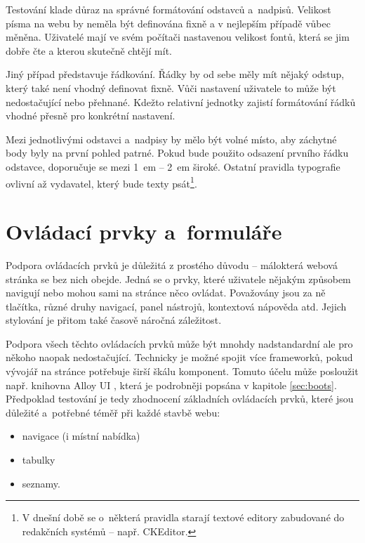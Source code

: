 \documentclass[thesis=B,czech]{FITthesis}[2012/06/26]
\begin{document}
Testování klade důraz na správné formátování odstavců a~nadpisů. Velikost písma na webu by neměla být definována fixně a v nejlepším případě vůbec měněna. Uživatelé mají ve svém počítači  nastavenou velikost fontů, která se jim dobře čte a kterou skutečně chtějí mít. 

Jiný případ představuje řádkování. Řádky by od sebe měly mít nějaký odstup, který také není vhodný definovat fixně. Vůči nastavení uživatele to může být nedostačující nebo přehnané. Kdežto relativní jednotky zajistí formátování řádků vhodné přesně pro konkrétní nastavení. 

Mezi jednotlivými odstavci a~nadpisy by mělo být volné místo, aby záchytné body byly na první pohled patrné. Pokud bude použito odsazení prvního řádku odstavce, doporučuje se mezi 1~em -- 2~em široké\cite{typo2}. Ostatní pravidla typografie ovlivní až vydavatel, který bude texty psát\footnote{V dnešní době se o~některá pravidla starají textové editory zabudované do redakčních systémů -- např. CKEditor.}. 



\section{Ovládací prvky a~formuláře}



Podpora ovládacích prvků je důležitá z prostého důvodu -- málokterá webová stránka se bez nich obejde. Jedná se o prvky, které uživatele nějakým způsobem navigují nebo mohou sami na stránce něco ovládat. Považovány jsou za ně tlačítka, různé druhy navigací, panel nástrojů, kontextová nápověda atd. Jejich stylování je přitom také časově náročná záležitost.  

Podpora všech těchto ovládacích prvků může být mnohdy nadstandardní ale pro někoho naopak nedostačující. Technicky je možné spojit více frameworků, pokud vývojář na stránce potřebuje širší škálu komponent. Tomuto účelu může posloužit např. knihovna Alloy UI , která je podrobněji popsána v kapitole \ref{sec:boots}. Předpoklad testování je tedy zhodnocení základních ovládacích prvků, které jsou důležité a~potřebné téměř při každé stavbě webu:

\begin{itemize}
 \item navigace (i místní nabídka)
 \item tabulky
 \item seznamy.
\end{itemize}
\end{document}

